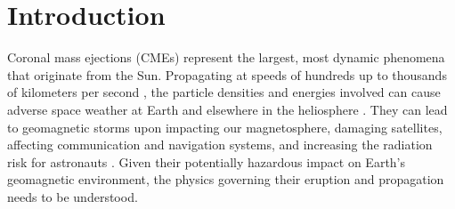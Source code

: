 \documentclass[namedreferences]{solarphysics}
\begin{document}
\begin{article}
\begin{opening}
\begin{abstract}
 
\end{abstract}



%


\end{opening}

%

\section{Introduction}
\label{intro}

Coronal mass ejections (CMEs) represent the largest, most dynamic phenomena that originate from the Sun. Propagating at speeds of hundreds up to thousands of kilometers per second \cite{2004JGRA..10907105Y}, the particle densities and energies involved can cause adverse space weather at Earth and elsewhere in the heliosphere \cite{2005AnGeo..23.1033S}. They can lead to geomagnetic storms upon impacting our magnetosphere, damaging satellites, affecting communication and navigation systems, and increasing the radiation risk for astronauts \cite{2007A&G....48f..11L}. Given their potentially hazardous impact on Earth's geomagnetic environment, the physics governing their eruption and propagation needs to be understood. 


\end{article}
\end{document}
